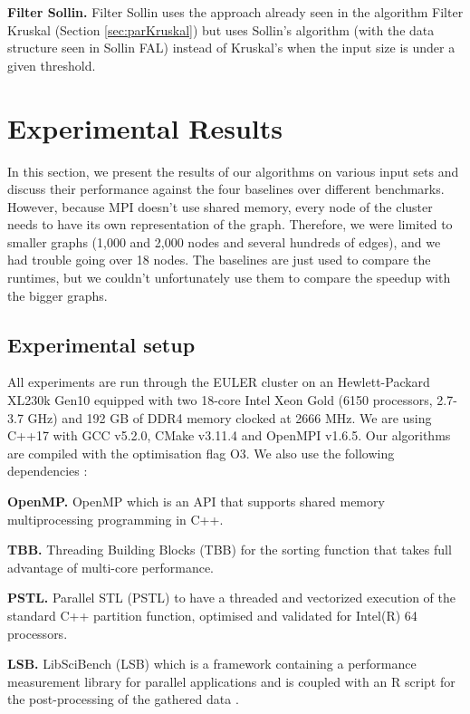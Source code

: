 \documentclass[letterpaper]{article}
\newcommand{\mypar}[1]{{\bf #1.}}
\begin{document}
\mypar{Filter Sollin} Filter Sollin uses the approach already seen in the algorithm Filter Kruskal (Section \ref{sec:parKruskal}) but uses Sollin's algorithm (with the data structure seen in Sollin FAL) instead of Kruskal's when the input size is under a given threshold.


\section{Experimental Results}\label{sec:exp}

In this section, we present the results of our algorithms on various input sets and discuss their performance against the four baselines over different benchmarks.
However, because MPI doesn't use shared memory, every node of the cluster needs to have its own representation of the graph.
Therefore, we were limited to smaller graphs (1,000 and 2,000 nodes and several hundreds of edges), and we had trouble going over 18 nodes.
The baselines are just used to compare the runtimes, but we couldn't unfortunately use them to compare the speedup with the bigger graphs.

\subsection{Experimental setup} \label{sec:setup}

All experiments are run through the EULER cluster on an Hewlett-Packard XL230k Gen10 equipped with two 18-core Intel Xeon Gold (6150 processors, 2.7-3.7 GHz) and 192 GB of DDR4 memory clocked at 2666 MHz. We are using C++17 with GCC v5.2.0, CMake v3.11.4 and OpenMPI v1.6.5. Our algorithms are compiled with the optimisation flag O3. We also use the following dependencies :

\mypar{OpenMP} OpenMP which is an API that supports shared memory multiprocessing programming in C++.

\mypar{TBB} Threading Building Blocks (TBB) for the sorting function that takes full advantage of multi-core performance.

\mypar{PSTL} Parallel STL (PSTL) to have a threaded and vectorized execution of the standard C++ partition function, optimised and validated for Intel(R) 64 processors.

\mypar{LSB} LibSciBench (LSB) which is a framework containing a performance measurement library for parallel applications and is coupled with an R script for the post-processing of the gathered data \cite{benchmarking} \cite{measuring}. 
\end{document}
